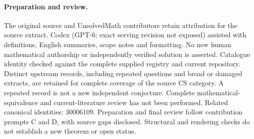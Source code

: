 \documentclass[11pt]{article}
\begin{document}
\paragraph{Preparation and review.}
The original source and UnsolvedMath contributors retain attribution for the source extract. Codex (GPT-6; exact serving revision not exposed) assisted with definitions, English summaries, scope notes and formatting. No new human mathematical authorship or independently verified solution is asserted. Catalogue identity checked against the complete supplied registry and current repository. Distinct upstream records, including repeated questions and broad or damaged extracts, are retained for complete coverage of the source CS category. A repeated record is not a new independent conjecture. Complete mathematical-equivalence and current-literature review has not been performed. Related canonical identities: 30006109. Preparation and final review follow contribution prompts C and D, with source gaps disclosed. Structural and rendering checks do not establish a new theorem or open status.
\label{end:statement}
\end{document}

